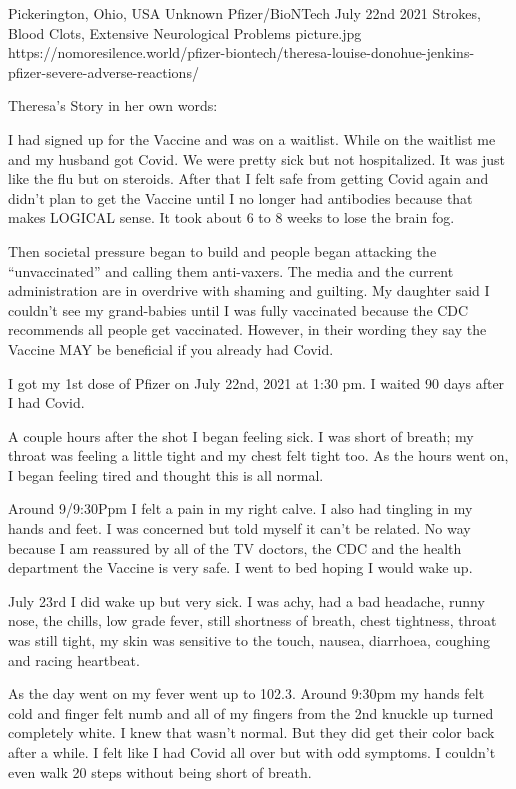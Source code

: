 {Pickerington, Ohio, USA}
{Unknown}
{Pfizer/BioNTech}
{July 22nd 2021}
{Strokes, Blood Clots, Extensive Neurological Problems}
{picture.jpg}
{https://nomoresilence.world/pfizer-biontech/theresa-louise-donohue-jenkins-pfizer-severe-adverse-reactions/}
{

\normalsize

Theresa’s Story in her own words:

I had signed up for the Vaccine and was on a waitlist. While on the waitlist me
and my husband got Covid. We were pretty sick but not hospitalized. It was just
like the flu but on steroids. After that I felt safe from getting Covid again
and didn’t plan to get the Vaccine until I no longer had antibodies because that
makes LOGICAL sense. It took about 6 to 8 weeks to lose the brain fog.

Then societal pressure began to build and people began attacking the
“unvaccinated” and calling them anti-vaxers. The media and the current
administration are in overdrive with shaming and guilting. My daughter said I
couldn’t see my grand-babies until I was fully vaccinated because the CDC
recommends all people get vaccinated. However, in their wording they say the
Vaccine MAY be beneficial if you already had Covid.

I got my 1st dose of Pfizer on July 22nd, 2021 at 1:30 pm. I waited 90 days
after I had Covid.

A couple hours after the shot I began feeling sick. I was short of breath; my
throat was feeling a little tight and my chest felt tight too. As the hours went
on, I began feeling tired and thought this is all normal.

Around 9/9:30Ppm I felt a pain in my right calve. I also had tingling in my
hands and feet. I was concerned but told myself it can’t be related. No way
because I am reassured by all of the TV doctors, the CDC and the health
department the Vaccine is very safe. I went to bed hoping I would wake up.

July 23rd I did wake up but very sick. I was achy, had a bad headache, runny
nose, the chills, low grade fever, still shortness of breath, chest tightness,
throat was still tight, my skin was sensitive to the touch, nausea, diarrhoea,
coughing and racing heartbeat.

As the day went on my fever went up to 102.3. Around 9:30pm my hands felt cold
and finger felt numb and all of my fingers from the 2nd knuckle up turned
completely white. I knew that wasn’t normal. But they did get their color back
after a while. I felt like I had Covid all over but with odd symptoms. I
couldn’t even walk 20 steps without being short of breath.

}
